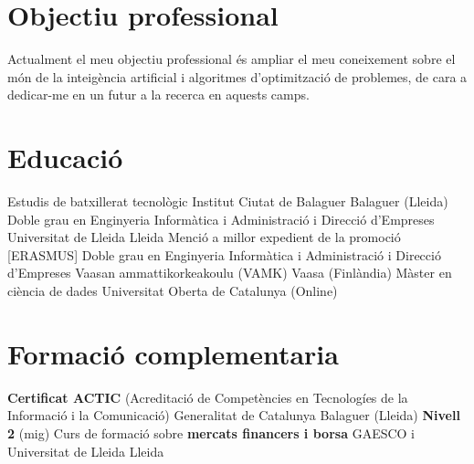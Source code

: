 \documentclass[a4paper,12pt,final]{moderncv}
\begin{document}
\makecvtitle

\section{Objectiu professional}
Actualment el meu objectiu professional és ampliar el meu coneixement
sobre el món de la inte\lgem igència artificial i algoritmes d'optimització
de problemes, de cara a dedicar-me en un futur a la recerca en aquests camps.

\section{Educació}
	{Estudis de batxillerat tecnològic}
	{Institut Ciutat de Balaguer}
	{Balaguer (Lleida)}
	{}
	{}
	{Doble grau en Enginyeria Informàtica i Administració i Direcció
		d'Empreses}
	{Universitat de Lleida}
	{Lleida}
	{Menció a millor expedient de la promoció}
	{}
	{[ERASMUS] Doble grau en Enginyeria Informàtica i
		Administració i Direcció d'Empreses}
	{Vaasan ammattikorkeakoulu (VAMK)}
	{Vaasa (Finlàndia)}
	{}
	{}
	{Màster en ciència de dades}
	{Universitat Oberta de Catalunya}
	{(Online)}
	{}
	{}

\section{Formació complementaria}
	{\textbf{Certificat ACTIC} (Acreditació de Competències en Tecnologíes de
		la Informació i la Comunicació)}
	{Generalitat de Catalunya}
	{Balaguer (Lleida)}
	{\textbf{Nivell 2} (mig)}
	{}
	{Curs de formació sobre \textbf{mercats financers i borsa}}
	{GAESCO i Universitat de Lleida}
	{Lleida}
	{}
	{}
	{}
\end{document}
